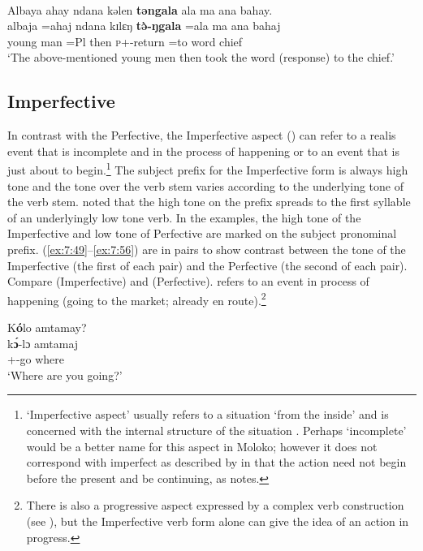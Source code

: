 \ea\label{ex:7:48}\\
Albaya  ahay  ndana  kəlen  \textbf{təngala}  ala  ma  ana  bahay.\\
\gll albaja       =ahaj        ndana  kɪlɛŋ   \textbf{t\`ə-ŋgala} =ala  ma  ana   bahaj\\
{young man}    =Pl  {\DEM}  then  \textsc{p}+{\PFV}-return   =to   word  {\DAT} chief\\
\glt ‘The above-mentioned young men then took the word (response) to the chief.’
\z
{}

\subsection{Imperfective}\label{sec:7.4.2}
\hypertarget{RefHeading1212241525720847}{}
In contrast with the Perfective, the Imperfective aspect (\textsc{{\IFV}}) can refer to a realis event that is incomplete and in the process of happening or to an event that is just about to begin.\footnote{‘Imperfective aspect’ %
usually refers to a situation ‘from the inside’ and is concerned with the internal structure of the situation \citep[4]{Comrie1976}. Perhaps ‘incomplete’ would be a better name for this aspect in Moloko; however it does not correspond with imperfect as described by \citet{Dixon2012} in that the action need not begin before the present and be continuing, as \citet[31]{Dixon2012} notes.} The subject prefix for the Imperfective form is always high tone and the tone over the verb stem varies according to the underlying tone of the verb stem. \citet{Bow1997c} noted that the high tone on the prefix spreads to the first syllable of an underlyingly low tone verb. In the examples, the high tone of the Imperfective and low tone of Perfective are marked on the subject pronominal prefix. (\ref{ex:7:49}--\ref{ex:7:56}) are in pairs to show contrast between the tone of the Imperfective (the first of each pair) and the Perfective (the second of each pair). Compare  (Imperfective) and  (Perfective).  refers to an event in process of happening (going to the market; already en route).\footnote{There is also a progressive aspect expressed by a complex verb construction (see ), but the Imperfective verb form alone can give the idea of an action in progress.} 

\ea\label{ex:7:49}
K\textbf{ó}lo  amtamay?\\
\gll k\textbf{\'ɔ}{}-lɔ amtamaj\\
{\twoS}+{\IFV}-go  where\\
\glt ‘Where are you going?’
\z

